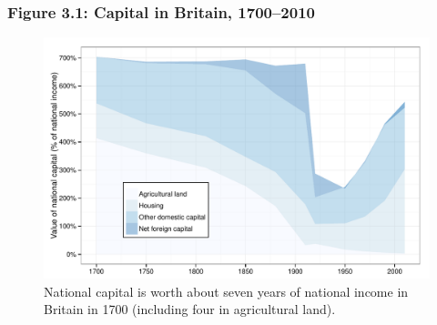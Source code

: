 \documentclass[t]{beamer}\usepackage[]{graphicx}\usepackage[]{color}
\newenvironment{knitrout}{}{} %
\begin{document}
\begin{frame}[label=Figure_3_1]
\frametitle{Figure 3.1: Capital in Britain, 1700--2010}
\begin{figure}[t]
\begin{minipage}[b]{\textwidth}
\centering
\begin{knitrout}\footnotesize
{}\color{fgcolor}

{\centering \includegraphics[width=1\linewidth]{figures/color/Figure_3_1} 

}



\end{knitrout}
\caption{National capital is worth about seven years of national income in Britain in 1700 (including four in agricultural land).}
\end{minipage}
\end{figure}
\end{frame}
\end{document}
